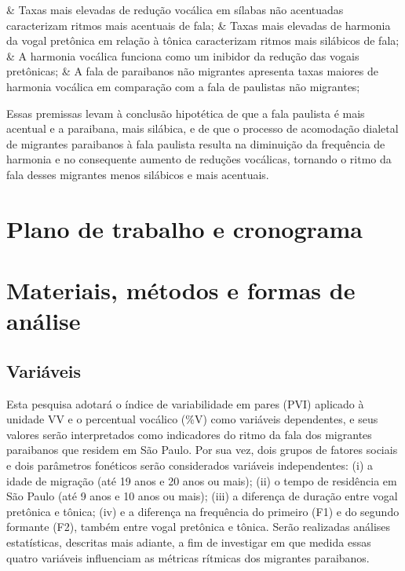 \documentclass[
			a4paper,		%
			12pt,			%
			oneside,
			]{article}		%
\begin{document}
\begin{easylist}[enumerate]
	& Taxas mais elevadas de redução vocálica em sílabas não acentuadas caracterizam 
	ritmos mais acentuais de fala;
	& Taxas mais elevadas de harmonia da vogal pretônica em relação à tônica caracterizam 
	ritmos mais silábicos de fala;
	& A harmonia vocálica funciona como um inibidor da redução das vogais pretônicas;
	& A fala de paraibanos não migrantes apresenta taxas maiores de harmonia vocálica em 
	comparação com a fala de paulistas não migrantes;
\end{easylist}

Essas premissas levam à conclusão hipotética de que a fala paulista é mais acentual e a 
paraibana, mais silábica, e de que o processo de acomodação dialetal de migrantes 
paraibanos à fala paulista resulta na diminuição da frequência de harmonia e no 
consequente aumento de reduções vocálicas, tornando o ritmo da fala desses migrantes 
menos silábicos e mais acentuais.

\section{Plano de trabalho e cronograma}
	
\section{Materiais, métodos e formas de análise}

	\subsection{Variáveis}
		
Esta pesquisa adotará o índice de variabilidade em pares (PVI) aplicado à unidade VV e o 
percentual vocálico (\%V) como variáveis dependentes, e seus valores serão interpretados 
como indicadores do ritmo da fala dos migrantes paraibanos que residem em São Paulo. Por 
sua vez, dois grupos de fatores sociais e dois parâmetros fonéticos serão considerados 
variáveis independentes: (i) a idade de migração (até 19 anos e 20 anos ou mais); (ii) o 
tempo de residência em São Paulo (até 9 anos e 10 anos ou mais); (iii) a diferença de 
duração entre vogal pretônica e tônica; (iv) e a diferença na frequência do primeiro (F1) 
e do segundo formante (F2), também entre vogal pretônica e tônica. Serão realizadas 
análises estatísticas, descritas mais adiante, a fim de investigar em que medida essas 
quatro variáveis influenciam as métricas rítmicas dos migrantes paraibanos.
\end{document}

